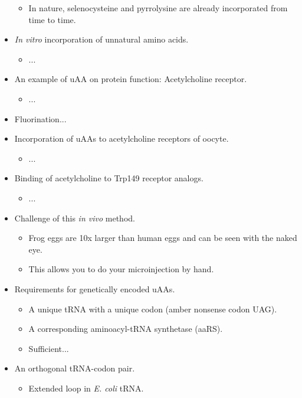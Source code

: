 \documentclass[../notes.tex]{subfiles}
\begin{document}
\begin{itemize}
    \begin{itemize}
        \item In nature, selenocysteine and pyrrolysine are already incorporated from time to time.
    \end{itemize}
    \item \emph{In vitro} incorporation of unnatural amino acids.
    \begin{itemize}
        \item ...
    \end{itemize}
    \item An example of uAA on protein function: Acetylcholine receptor.
    \begin{itemize}
        \item ...
    \end{itemize}
    \item Fluorination...
    \item Incorporation of uAAs to acetylcholine receptors of oocyte.
    \begin{itemize}
        \item ...
    \end{itemize}
    \item Binding of acetylcholine to Trp149 receptor analogs.
    \begin{itemize}
        \item ...
    \end{itemize}
    \item Challenge of this \emph{in vivo} method.
    \begin{itemize}
        \item Frog eggs are 10x larger than human eggs and can be seen with the naked eye.
        \item This allows you to do your microinjection by hand.
    \end{itemize}
    \item Requirements for genetically encoded uAAs.
    \begin{itemize}
        \item A unique tRNA with a unique codon (amber nonsense codon UAG).
        \item A corresponding aminoacyl-tRNA synthetase (aaRS).
        \item Sufficient...
    \end{itemize}
    \item An orthogonal tRNA-codon pair.
    \begin{itemize}
        \item Extended loop in \emph{E. coli} tRNA.

\end{itemize}
\end{itemize}
\end{document}

